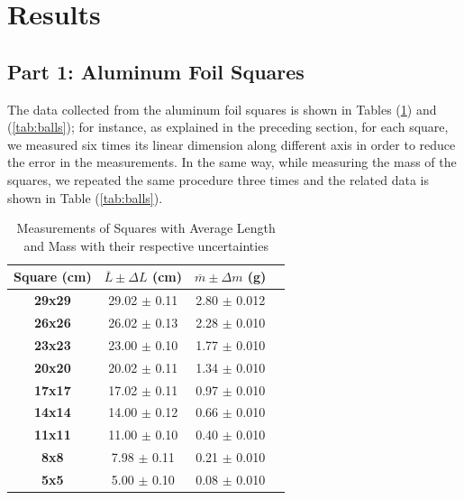 \documentclass[a4paper,12pt]{article}
\begin{document}
\section{Results}\label{sec:results}
\subsection{Part 1: Aluminum Foil Squares}
The data collected from the aluminum foil squares is shown in Tables (\ref{tab:squares}) and (\ref{tab:balls}); for instance, as explained in the preceding section, 
for each square, we measured six times its linear dimension along different axis in order to reduce the error in the measurements. 
In the same way, while measuring the mass of the squares, we repeated the same procedure three times and the related data is shown 
in Table (\ref{tab:balls}).

\begin{table}[!ht]
    \centering
    \begin{tabular}{|c|c|c|c|}
    \hline
        \textbf{Square (cm)} & \( \overline{L} \pm \Delta L \) (cm) & \( \overline{m} \pm \Delta m \) (g) \\ \hline 
        \textbf{29x29} & 29.02 \(\pm\) 0.11 & 2.80 \(\pm\) 0.012 \\ \hline
        \textbf{26x26} & 26.02 \(\pm\) 0.13 & 2.28 \(\pm\) 0.010 \\ \hline
        \textbf{23x23} & 23.00 \(\pm\) 0.10 & 1.77 \(\pm\) 0.010 \\ \hline 
        \textbf{20x20} & 20.02 \(\pm\) 0.11 & 1.34 \(\pm\) 0.010 \\ \hline
        \textbf{17x17} & 17.02 \(\pm\) 0.11 & 0.97 \(\pm\) 0.010 \\ \hline
        \textbf{14x14} & 14.00 \(\pm\) 0.12 & 0.66 \(\pm\) 0.010 \\ \hline
        \textbf{11x11} & 11.00 \(\pm\) 0.10 & 0.40 \(\pm\) 0.010 \\ \hline
        \textbf{8x8}   & 7.98  \(\pm\) 0.11 & 0.21 \(\pm\) 0.010 \\ \hline
        \textbf{5x5}   & 5.00  \(\pm\) 0.10 & 0.08 \(\pm\) 0.010 \\ \hline
    \end{tabular}
    \caption{Measurements of Squares with Average Length and Mass with their respective uncertainties}
    \label{tab:squares}
\end{table}
\end{document}
